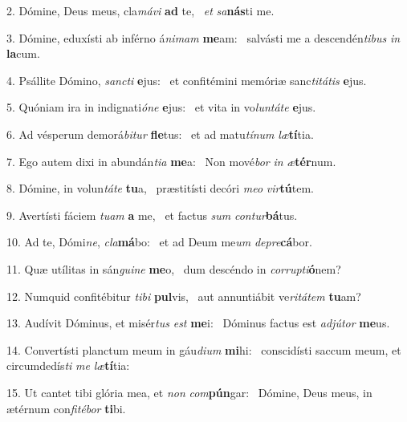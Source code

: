2. Dómine, Deus meus, cla\textit{má}\textit{vi} \textbf{ad} te, \ast\  \textit{et} \textit{sa}\textbf{nás}ti me.\

3. Dómine, eduxísti ab inférno á\textit{ni}\textit{mam} \textbf{me}am: \ast\  salvásti me a descendén\textit{ti}\textit{bus} \textit{in} \textbf{la}cum.\

4. Psállite Dómino, \textit{sanc}\textit{ti} \textbf{e}jus: \ast\  et confitémini memóriæ sanc\textit{ti}\textit{tá}\textit{tis} \textbf{e}jus.\

5. Quóniam ira in indignati\textit{ó}\textit{ne} \textbf{e}jus: \ast\  et vita in vo\textit{lun}\textit{tá}\textit{te} \textbf{e}jus.\

6. Ad vésperum demorá\textit{bi}\textit{tur} \textbf{fle}tus: \ast\  et ad matu\textit{tí}\textit{num} \textit{læ}\textbf{tí}tia.\

7. Ego autem dixi in abundán\textit{ti}\textit{a} \textbf{me}a: \ast\  Non mové\textit{bor} \textit{in} \textit{æ}\textbf{tér}num.\

8. Dómine, in volun\textit{tá}\textit{te} \textbf{tu}a, \ast\  præstitísti decóri \textit{me}\textit{o} \textit{vir}\textbf{tú}tem.\

9. Avertísti fáciem \textit{tu}\textit{am} \textbf{a} me, \ast\  et factus \textit{sum} \textit{con}\textit{tur}\textbf{bá}tus.\

10. Ad te, Dómi\textit{ne}, \textit{cla}\textbf{má}bo: \ast\  et ad Deum me\textit{um} \textit{de}\textit{pre}\textbf{cá}bor.\

11. Quæ utílitas in sán\textit{gui}\textit{ne} \textbf{me}o, \ast\  dum descéndo in \textit{cor}\textit{rup}\textit{ti}\textbf{ó}nem?\

12. Numquid confitébitur \textit{ti}\textit{bi} \textbf{pul}vis, \ast\  aut annuntiábit ve\textit{ri}\textit{tá}\textit{tem} \textbf{tu}am?\

13. Audívit Dóminus, et misér\textit{tus} \textit{est} \textbf{me}i: \ast\  Dóminus factus est \textit{ad}\textit{jú}\textit{tor} \textbf{me}us.\

14. Convertísti planctum meum in gáu\textit{di}\textit{um} \textbf{mi}hi: \ast\  conscidísti saccum meum, et circumdedís\textit{ti} \textit{me} \textit{læ}\textbf{tí}tia:\

15. Ut cantet tibi glória mea, et \textit{non} \textit{com}\textbf{pún}gar: \ast\  Dómine, Deus meus, in ætérnum con\textit{fi}\textit{té}\textit{bor} \textbf{ti}bi.\

